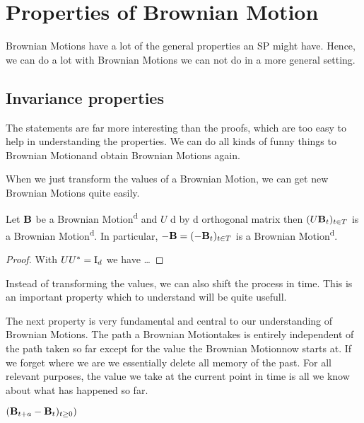 \def\BM{Brownian Motion}
\chapter{Properties of \BM}

\BM s have a lot of the general properties an SP might have.
Hence, we can do a lot with \BM s we can not do in a more general setting.

\section{Invariance properties}
The statements are far more interesting than the proofs,
which are too easy to help in understanding the properties.
We can do all kinds of funny things to \BM and obtain \BM s again.

When we just transform the values of a \BM,
we can get new \BM s quite easily.

\begin{prop}
	Let \(\mathbf{B}\) be a \def\BMd{\BM\textsuperscript{d}}\BMd
	and \(U\) d by d orthogonal matrix
	then \((U\mathbf{B}_t)_{t\in T}\) is a \BMd.
	In particular, \(-\mathbf{B} = (-\mathbf{B}_t)_{t\in T}\) is a \BMd.
\end{prop}

\begin{proof}
	With \(UU^* = \mathrm{I}_d\) we have …
\end{proof}

Instead of transforming the values,
we can also shift the process in time.
This is an important property which to understand will be quite usefull.

\begin{prop}
\end{prop}

The next property is very fundamental
and central to our understanding of \BM s.
The path a \BM takes is entirely independent of the path taken so far
except for the value the \BM now starts at.
If we forget where we are
we essentially delete all memory of the past.
For all relevant purposes,
the value we take at the current point in time
is all we know about what has happened so far.

\begin{prop}
	\((\mathbf{B}_{t+a}-\mathbf{B}_t)_{t \geq 0})\)
\end{prop}

